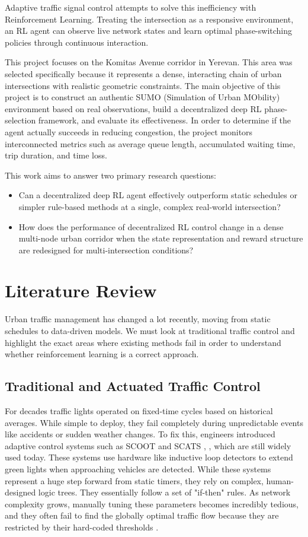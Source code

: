 \documentclass[conference]{IEEEtran}
\begin{document}
Adaptive traffic signal control attempts to solve this inefficiency with Reinforcement Learning. Treating the intersection as a responsive environment, an RL agent can observe live network states and learn optimal phase-switching policies through continuous interaction.

This project focuses on the Komitas Avenue corridor in Yerevan. This area was selected specifically because it represents a dense, interacting chain of urban intersections with realistic geometric constraints. The main objective of this project is to construct an authentic SUMO (Simulation of Urban MObility) environment based on real observations, build a decentralized deep RL phase-selection framework, and evaluate its effectiveness. In order to determine if the agent actually succeeds in reducing congestion, the project monitors interconnected metrics such as average queue length, accumulated waiting time, trip duration, and time loss.

This work aims to answer two primary research questions:

\begin{itemize}
    \item Can a decentralized deep RL agent effectively outperform static schedules or simpler rule-based methods at a single, complex real-world intersection?

    \item How does the performance of decentralized RL control change in a dense multi-node urban corridor when the state representation and reward structure are redesigned for multi-intersection conditions?
\end{itemize}

\section{Literature Review}

Urban traffic management has changed a lot recently, moving from static schedules to data-driven models. We must look at traditional traffic control and highlight the exact areas where existing methods fail in order to understand whether reinforcement learning is a correct approach.

\subsection{Traditional and Actuated Traffic Control}
For decades traffic lights operated on fixed-time cycles based on historical averages. While simple to deploy, they fail completely during unpredictable events like accidents or sudden weather changes. To fix this, engineers introduced adaptive control systems such as SCOOT and SCATS \cite{b1}, \cite{b2}, which are still widely used today. These systems use hardware like inductive loop detectors to extend green lights when approaching vehicles are detected. While these systems represent a huge step forward from static timers, they rely on complex, human-designed logic trees. They essentially follow a set of "if-then" rules. As network complexity grows, manually tuning these parameters becomes incredibly tedious, and they often fail to find the globally optimal traffic flow because they are restricted by their hard-coded thresholds \cite{b2}.
\end{document}

